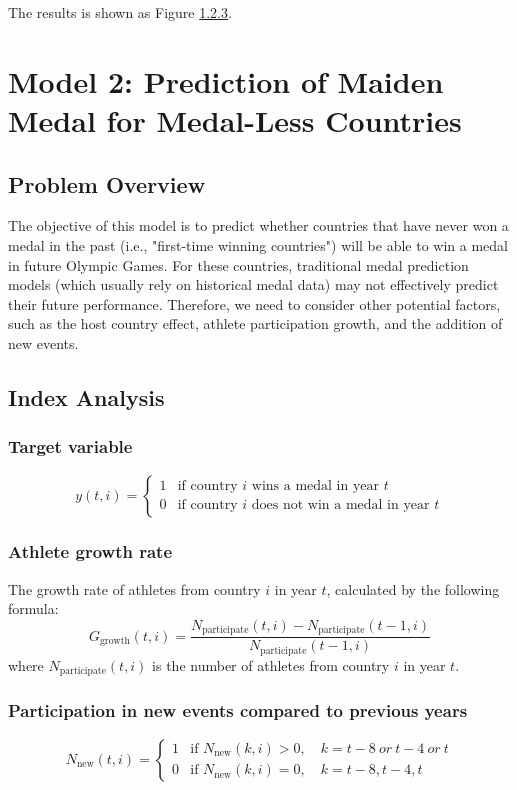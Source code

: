 \documentclass{mcmthesis}
\begin{document}
The results is shown as Figure \ref{}.











\section{Model 2: Prediction of Maiden Medal for Medal-Less Countries}


\subsection{Problem Overview}
The objective of this model is to predict whether countries that have never won a medal in the past (i.e., "first-time winning countries") will be able to win a medal in future Olympic Games. For these countries, traditional medal prediction models (which usually rely on historical medal data) may not effectively predict their future performance. Therefore, we need to consider other potential factors, such as the host country effect, athlete participation growth, and the addition of new events.


\subsection{Index Analysis}


\subsubsection{Target variable}
\[
y(t,i) = 
\begin{cases} 
	1 & \text{if country } i \text{ wins a medal in year } t \\ 
	0 & \text{if country } i \text{ does not win a medal in year } t 
\end{cases}
\]
\subsubsection{Athlete growth rate}
The growth rate of athletes from country $i$ in year $t$, calculated by the following formula:
\[
G_{\text{growth}}(t,i) = \frac{N_{\text{participate}}(t,i) - N_{\text{participate}}(t-1,i)}{N_{\text{participate}}(t-1,i)}
\]
where $N_{\text{participate}}(t,i)$ is the number of athletes from country $i$ in year $t$.


\subsubsection{Participation in new events compared to previous years} 
\[
N_{\text{new}}(t,i) =
\begin{cases}
	1 & \text{if } N_{\text{new}}(k,i) > 0, \quad k = t-8\ or\ t-4\ or\ t \\
	0 & \text{if } N_{\text{new}}(k,i) = 0, \quad k = t-8, t-4, t
\end{cases}
\]
\end{document}
